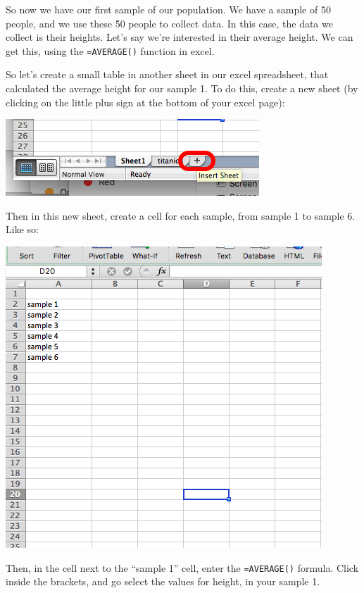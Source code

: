 \documentclass[
]{book}
\begin{document}
So now we have our first sample of our population. We have a sample of 50 people, and we use these 50 people to collect data. In this case, the data we collect is their heights. Let's say we're interested in their average height. We can get this, using the \texttt{=AVERAGE()} function in excel.

So let's create a small table in another sheet in our excel spreadsheet, that calculated the average height for our sample 1. To do this, create a new sheet (by clicking on the little plus sign at the bottom of your excel page):

\includegraphics{imgs/new_sheet_2.png}

Then in this new sheet, create a cell for each sample, from sample 1 to sample 6. Like so:

\includegraphics{imgs/set_for_avgs.png}

Then, in the cell next to the ``sample 1'' cell, enter the \texttt{=AVERAGE()} formula. Click inside the brackets, and go select the values for height, in your sample 1.
\end{document}
